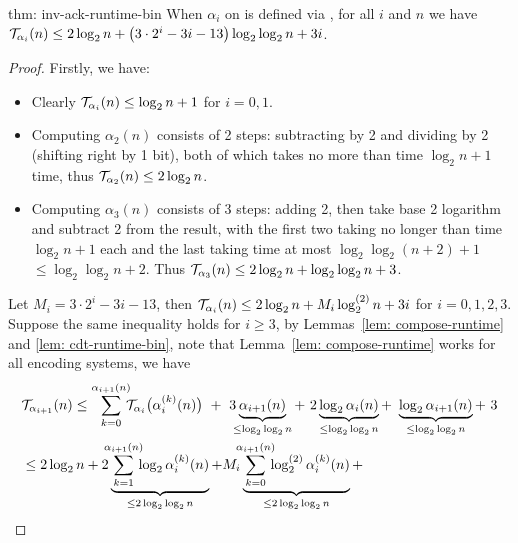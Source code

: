 \begin{usethmcounterof}{thm: inv-ack-runtime-bin}
	When $\alpha_i$ on  is defined via , for all $i$ and $n$ we have $\mathcal{T}_{\alpha_i}(n) \le 2\log_2n + \left(3\cdot 2^i - 3i - 13\right)\log_2\log_2n + 3i$.
\end{usethmcounterof}

\begin{proof}
	Firstly, we have:
	\begin{itemize}
		\item Clearly $\mathcal{T}_{\alpha_i}(n)\le \log_2n + 1$ for $i = 0, 1$.
		\item Computing $\alpha_2(n)$ consists of 2 steps: subtracting by 2 and dividing by 2 (shifting right by 1 bit), both of which takes no more than time $\log_2n + 1$ time, thus $\mathcal{T}_{\alpha_2}(n)\le 2\log_2n$.
		\item Computing $\alpha_3(n)$ consists of 3 steps: adding 2, then take base 2 logarithm and subtract 2 from the result, with the first two taking no longer than time $\log_2n + 1$ each and the last taking time at most $\log_2\log_2(n+2) + 1$ $\le \log_2\log_2 n + 2$. Thus $\mathcal{T}_{\alpha_3}(n)\le 2\log_2n + \log_2\log_2n + 3$.
	\end{itemize}
  Let $M_i = 3\cdot 2^i - 3i - 13$, then $\mathcal{T}_{\alpha_i}(n)\le 2\log_2n + M_i\log_2^{(2)}n + 3i$ for $i = 0, 1, 2, 3$.
	Suppose the same inequality holds for $i\ge 3$, by Lemmas~\ref{lem: compose-runtime} and \ref{lem: cdt-runtime-bin}, note that Lemma~\ref{lem: compose-runtime} works for all encoding systems, we have
	\begin{equation*}
	\begin{aligned}
	& \runtime_{\alpha_{i+1}}(n) \le
	\sum_{k=0}^{\alpha_{i+1}(n)} \hspace{-5pt} \runtime_{\alpha_i}\big(\alpha_i^{(k)}(n)\big)
	\ + \ 3\hspace{-4pt}\underbrace{\alpha_{i+1}(n)}_{\le \log_2\log_2n}
	+ \ 2\underbrace{\log_2\alpha_i(n)}_{\le \log_2\log_2n}
	+ \ \underbrace{\log_2\alpha_{i+1}(n)}_{\le \log_2\log_2n} + \ 3 \\
	& \le 2\log_2n
	+ 2\underbrace{\hspace{-5pt}\sum_{k=1}^{\alpha_{i+1}(n)}\hspace{-5pt} \log_2\alpha_i^{(k)}(n)}_{\le 2\log_2\log_2n}
	+ M_i\underbrace{\hspace{-5pt}\sum_{k=0}^{\alpha_{i+1}(n)}\hspace{-5pt} \log_2^{(2)}\alpha_i^{(k)}(n)}_{\le 2\log_2\log_2n} + \\

\end{aligned}
\end{equation*}
\end{proof}
